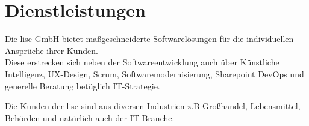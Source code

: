 \section{Dienstleistungen}\label{sec:dienstleistungen}
Die lise GmbH bietet maßgeschneiderte Softwarelösungen für die individuellen Ansprüche ihrer Kunden.\\
Diese erstrecken sich neben der Softwareentwicklung auch über Künstliche Intelligenz, UX-Design, Scrum,
Softwaremodernisierung, Sharepoint DevOps und generelle Beratung betüglich IT-Strategie.\autocite[/ueber-uns/unternehmen]{LiseWeb}

Die Kunden der lise sind aus diversen Industrien z.B Großhandel, Lebensmittel, Behörden und natürlich auch der IT-Branche.






